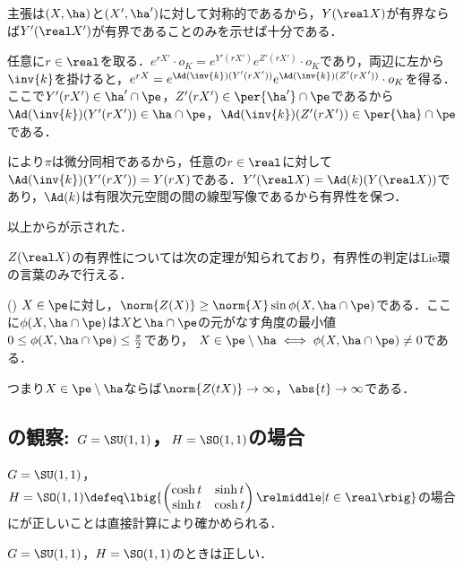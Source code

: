 \begin{npfwn}
  主張は$(X,\ha) $と$(X',\ha')$に対して対称的であるから，$Y(\real X) $が有界ならば$Y'(\real X') $が有界であることのみを示せば十分である．

  任意に$r\in \real$を取る．$e^{rX'}\cdot o_K = e^{Y'(r X')}e^{Z'(r X')}\cdot o_K  $であり，両辺に左から$\inv{k} $を掛けると，$e^{r X} = e^{\Ad(\inv{k})( Y'(r X'))}e^{\Ad(\inv{k})( Z'(r X'))}\cdot o_K  $を得る．ここで$Y'(rX')\in \ha'\cap \pe $，$Z'(r X')\in \per{\ha'}\cap \pe $であるから$\Ad(\inv{k})(Y'(r X'))\in \ha\cap \pe $，$\Ad(\inv{k})(Z'(r X')) \in \per{\ha}\cap \pe $である．

  により$\pi$は微分同相であるから，任意の$r\in \real$に対して$\Ad(\inv{k})(Y'(r X')) = Y(rX)  $である．$Y'(\real X) = \Ad(k)(Y(\real X))  $であり，$\Ad(k) $は有限次元空間の間の線型写像であるから有界性を保つ．

  以上からが示された．  
\end{npfwn}


$Z(\real X) $の有界性については次の定理が知られており，有界性の判定はLie環の言葉のみで行える．

\begin{thm}(\cite[Lemmma~5.4]{kob97})\label{thm:kob97}  
  $X\in \pe$に対し，$\norm{Z(X)}\geq \norm{X} \sin\phi(X, \ha\cap\pe)$である．ここに$\phi(X,\ha\cap \pe) $は$X$と$\ha\cap \pe$の元がなす角度の最小値$0\leq \phi(X,\ha\cap \pe) \leq \frac{\pi}{2} $であり，
  $X\in \pe\setminus \ha \iff \phi(X,\ha\cap \pe)\neq 0 $である．
\end{thm}

つまり$ X\in \pe\setminus \ha$ならば$\norm{Z(t X)}\to \infty $，$\abs{t}\to \infty $である．


\subsection{の観察: $G = \SU(1,1) $，$H = \SO(1,1) $の場合}

$G = \SU(1,1) $，$H = \SO(1,1) \defeq\lbig\{
\begin{pmatrix}
  \cosh t & \sinh t\\ \sinh t & \cosh t
\end{pmatrix}
\relmiddle| t\in \real \rbig\} $の場合にが正しいことは直接計算により確かめられる．

\begin{prop}\label{prop:yosou-eg}
  $G = \SU(1,1) $，$H = \SO(1,1) $のときは正しい．
\end{prop}


